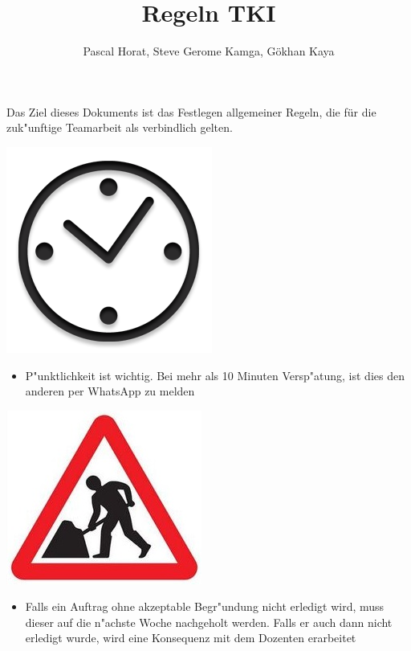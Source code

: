 \documentclass[12pt]{article}
\title{Regeln TKI}
\author{Pascal Horat, Steve Gerome Kamga, Gökhan Kaya}
\begin{document}
\maketitle

Das Ziel dieses Dokuments ist das Festlegen allgemeiner Regeln, die für die zuk"unftige Teamarbeit als verbindlich gelten.\\

\begin{center}
\includegraphics[scale=0.25]{clock}\\
\end{center}


\begin{itemize}
\item P"unktlichkeit ist wichtig. Bei mehr als 10 Minuten Versp"atung, ist dies den anderen per WhatsApp zu melden
\end{itemize}

\begin{center}
\includegraphics[scale=1.1]{work}\\
\end{center}

\begin{itemize}
\item Falls ein Auftrag ohne akzeptable Begr"undung nicht erledigt wird, muss dieser auf die n"achste Woche nachgeholt werden. Falls er auch dann nicht erledigt wurde, wird eine Konsequenz mit dem Dozenten erarbeitet
\end{itemize}
\end{document}
